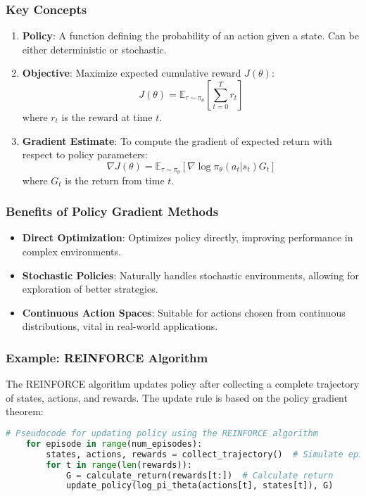 \documentclass[aspectratio=169]{beamer}
\begin{document}
\begin{frame}
    \frametitle{Key Concepts}
    \begin{enumerate}
        \item \textbf{Policy}: A function defining the probability of an action given a state. Can be either deterministic or stochastic.
        
        \item \textbf{Objective}: Maximize expected cumulative reward \( J(\theta) \):
        \begin{equation}
            J(\theta) = \mathbb{E}_{\tau \sim \pi_\theta} \left[ \sum_{t=0}^{T} r_t \right]
        \end{equation}
        where \( r_t \) is the reward at time \( t \).

        \item \textbf{Gradient Estimate}: To compute the gradient of expected return with respect to policy parameters:
        \begin{equation}
            \nabla J(\theta) = \mathbb{E}_{\tau \sim \pi_\theta} \left[ \nabla \log \pi_\theta(a_t | s_t) G_t \right]
        \end{equation}
        where \( G_t \) is the return from time \( t \).
    \end{enumerate}
\end{frame}

\begin{frame}[fragile]
    \frametitle{Benefits of Policy Gradient Methods}
    \begin{itemize}
        \item \textbf{Direct Optimization}: Optimizes policy directly, improving performance in complex environments.
        
        \item \textbf{Stochastic Policies}: Naturally handles stochastic environments, allowing for exploration of better strategies.
        
        \item \textbf{Continuous Action Spaces}: Suitable for actions chosen from continuous distributions, vital in real-world applications.
    \end{itemize}
\end{frame}

\begin{frame}[fragile]
    \frametitle{Example: REINFORCE Algorithm}
    The REINFORCE algorithm updates policy after collecting a complete trajectory of states, actions, and rewards. The update rule is based on the policy gradient theorem:
    
    \begin{lstlisting}[language=Python, basicstyle=\footnotesize]
    # Pseudocode for updating policy using the REINFORCE algorithm
    for episode in range(num_episodes):
        states, actions, rewards = collect_trajectory()  # Simulate episode
        for t in range(len(rewards)):
            G = calculate_return(rewards[t:])  # Calculate return
            update_policy(log_pi_theta(actions[t], states[t]), G)
    \end{lstlisting}
\end{frame}
\end{document}
